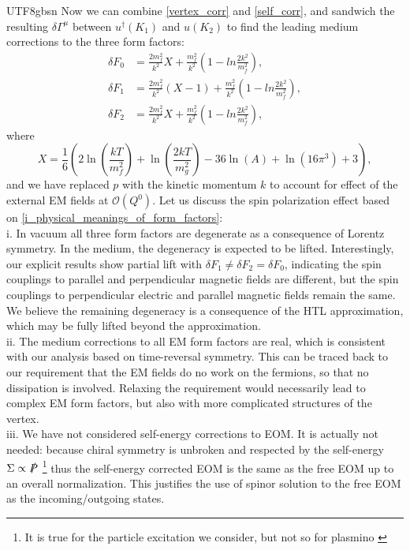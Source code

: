 \documentclass[11pt]{article}\def\baselinestretch{1.4}
\def\d{{\delta}}
\def\G{{\Gamma}}
\def\m{{\mu}}
\def\S{{\Sigma}}
\newcommand{\dg}{\dagger}
\begin{document}
\begin{CJK}{UTF8}{gbsn}
Now we can combine \eqref{vertex_corr} and \eqref{self_corr}, and sandwich the resulting $\d\G^\m$ between $u^\dg(K_1)$ and $u(K_2)$ to find the leading medium corrections to the three form factors:
\begin{align}
\delta F_0 &= \frac{2m_f^2}{k^2}X+\frac{m_f^2}{k^2}\left( 1-ln\frac{2k^2}{m_f^2} \right), \label{delta_F_0}\\
\delta F_1 &= \frac{2m_f^2}{k^2}(X-1)+\frac{m_f^2}{k^2}\left( 1-ln\frac{2k^2}{m_f^2} \right), \label{delta_F_1}\\
\delta F_2 &= \frac{2m_f^2}{k^2}X+\frac{m_f^2}{k^2}\left( 1-ln\frac{2k^2}{m_f^2} \right), \label{delta_F_2}
\end{align}
where $$X=\frac{1}{6}\left(2 \ln \left(\frac{kT}{m_f^2}\right)+\ln \left(\frac{2 kT}{m_{g}^2}\right)-36 \ln (A)+\ln \left(16 \pi ^3 \right)+3\right),$$
and we have replaced $p$ with the kinetic momentum $k$ to account for effect of the external EM fields at $\mathcal{O}(Q^0)$.
%
Let us discuss the spin polarization effect based on \eqref{i_physical_meanings_of_form_factors}:\\
%
i. In vacuum all three form factors are degenerate as a consequence of Lorentz symmetry. In the medium, the degeneracy is expected to be lifted. Interestingly, our explicit results show partial lift with $\d F_1\ne\d F_2=\d F_0$, indicating the spin couplings to parallel and perpendicular magnetic fields are different, but the spin couplings to perpendicular electric and parallel magnetic fields remain the same. We believe the remaining degeneracy is a consequence of the HTL approximation, which may be fully lifted beyond the approximation.\\
%
ii. The medium corrections to all EM form factors are real, which is consistent with our analysis based on time-reversal symmetry. This can be traced back to our requirement that the EM fields do no work on the fermions, so that no dissipation is involved. Relaxing the requirement would necessarily lead to complex EM form factors, but also with more complicated structures of the vertex.\\
%
iii. We have not considered self-energy corrections to EOM. It is actually not needed: because chiral symmetry is unbroken and respected by the self-energy $\S\propto \slashed{P}$ \footnote{It is true for the particle excitation we consider, but not so for plasmino \cite{le2000thermal}} thus the self-energy corrected EOM is the same as the free EOM up to an overall normalization. This justifies the use of spinor solution to the free EOM as the incoming/outgoing states.\\

\end{CJK}
\end{document}
